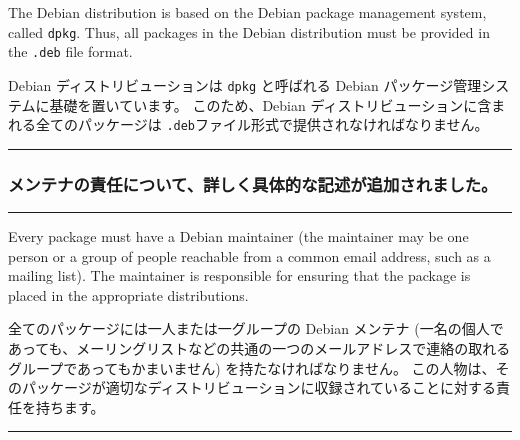 \documentclass[mingoth,a4paper]{jsarticle}
\begin{document}
\par
\parbox{0.48\linewidth}{
	  The Debian distribution is based on the Debian
	  package management system, called {\tt dpkg}. Thus,
	  all packages in the Debian distribution must be provided
	  in the {\tt .deb} file format.
}\hfil
\parbox{0.48\linewidth}{
	  Debian ディストリビューションは {\tt dpkg}
	  と呼ばれる Debian パッケージ管理システムに基礎を置いています。
	  このため、Debian ディストリビューションに含まれる全てのパッケージは
	   {\tt .deb}ファイル形式で提供されなければなりません。
}
\hrule
\vspace{1ex}

\subsubsection{メンテナの責任について、詳しく具体的な記述が追加されました。}
\vspace{1ex}
\hrule
{}\par
\parbox[t]{0.46\linewidth}{
	    Every package must have a Debian maintainer (the
	    maintainer may be one person or a group of people
	    reachable from a common email address, such as a mailing
	    list).  The maintainer is responsible for ensuring that
	    the package is placed in the appropriate distributions.
}\hfil
\parbox[t]{0.46\linewidth}{
	    全てのパッケージには一人または一グループの Debian メンテナ
	    (一名の個人であっても、メーリングリストなどの共通の一つのメールアドレスで連絡の取れるグループであってもかまいません)
	    を持たなければなりません。
	    この人物は、そのパッケージが適切なディストリビューションに収録されていることに対する責任を持ちます。
}
\hrule
\end{document}
